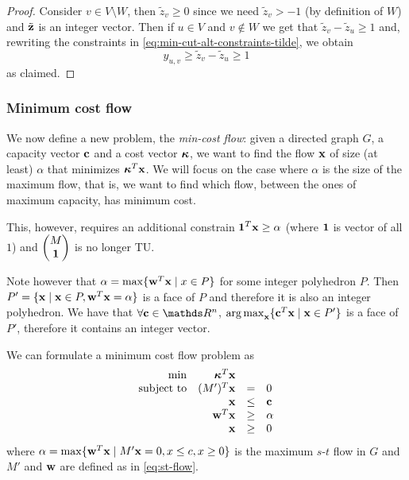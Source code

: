 \documentclass[12pt]{extarticle}
\renewcommand{\vec}[1]{\bvec{#1}}
\begin{document}
\begin{proof}
	Consider $v \in V\setminus W$, then $\tilde z_v \geq 0$ since we need $\tilde z_v > -1$ (by
	definition of $W$) and $\tilde{\vec z}$ is an integer vector.
	Then if $u \in V$ and $v \notin W$ we get that $\tilde z_v - \tilde z_u \geq 1$ and, rewriting the
	constraints in \cref{eq:min-cut-alt-constraints-tilde}, we obtain
	\begin{equation}
		y_{u, v} \geq \tilde z_v - \tilde z_u \geq 1
	\end{equation}
	as claimed.
\end{proof}

\subsubsection{Minimum cost flow}
We now define a new problem, the \emph{min-cost flow}: given a directed graph $G$, a capacity vector
$\vec c$ and a cost vector $\vec \kappa$, we want to find the flow $\vec x$ of size (at least)
$\alpha$ that minimizes $\vec \kappa^T \vec x$.
We will focus on the case where $\alpha$ is the size of the maximum flow, that is, we want to find
which flow, between the ones of maximum capacity, has minimum cost.

This, however, requires an additional constrain $\vec 1^T \vec x \geq \alpha$ (where $\vec 1$ is
vector of all $1$) and $\begin{pmatrix}M \\ \vec 1 \end{pmatrix}$ is no longer TU.

Note however that $\alpha= \max \{\vec w^T \vec x \mid x \in P \}$ for some integer polyhedron $P$.
Then $P' = \{ \vec x \mid \vec x \in P, \vec w^T \vec x = \alpha \}$ is a face of $P$ and therefore
it is also an integer polyhedron.
We have that $\forall \vec c \in \R^n$, $\argmax_{\vec x} \{ \vec c^T \vec x \mid \vec x \in P'\}$
is a face of $P'$, therefore it contains an integer vector.

We can formulate a minimum cost flow problem as
\begin{equation}
	\begin{array}{rrcl}
		\min              & \vec \kappa^T \vec x &      &        \\
		\text{subject to} & (M')^T \vec x        & =    & 0      \\
		                  & \vec x               & \leq & \vec c \\
		                  & \vec w^T \vec x      & \geq & \alpha \\
		                  & \vec x               & \geq & 0
	\end{array}
\end{equation}
where $\alpha = \max \{\vec w^T \vec x \mid M'\vec x = 0, x \leq c, x \geq 0 \}$ is the maximum
$s$-$t$ flow in $G$ and $M'$ and $\vec w$ are defined as in \cref{eq:st-flow}.
\end{document}
